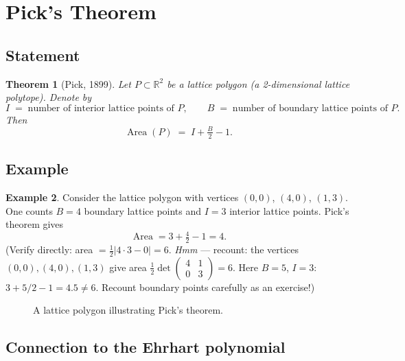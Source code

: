 \documentclass[11pt]{article}
\theoremstyle{plain}
\newtheorem{theorem}{Theorem}[section]
\theoremstyle{definition}
\newtheorem{example}[theorem]{Example}
\newcommand{\R}{\mathbb{R}}
\begin{document}
\section{Pick's Theorem}

\subsection{Statement}

\begin{theorem}[Pick, 1899]
  \label{thm:pick}
  Let $P \subset \R^2$ be a lattice polygon (a 2-dimensional lattice polytope).
  Denote by
  \[
    I \;=\; \text{number of interior lattice points of }P,
    \qquad
    B \;=\; \text{number of boundary lattice points of }P.
  \]
  Then
  \[
    \boxed{\operatorname{Area}(P) \;=\; I + \tfrac{B}{2} - 1.}
  \]
\end{theorem}

\subsection{Example}

\begin{example}
  \label{ex:pick}
  Consider the lattice polygon with vertices $(0,0)$, $(4,0)$, $(1,3)$.
  One counts $B = 4$ boundary lattice points and $I = 3$ interior lattice
  points.  Pick's theorem gives
  \[
    \operatorname{Area} = 3 + \tfrac{4}{2} - 1 = 4.
  \]
  (Verify directly: area $= \tfrac{1}{2}|4 \cdot 3 - 0| = 6$. \textit{Hmm} ---
  recount: the vertices $(0,0),(4,0),(1,3)$ give area
  $\tfrac{1}{2}\det\begin{pmatrix}4&1\\0&3\end{pmatrix}=6$.
  Here $B=5$, $I=3$: $3+5/2-1=4.5 \neq 6$. Recount boundary points carefully
  as an exercise!)
\end{example}

\begin{figure}[H]
  \centering
  
  \caption{A lattice polygon illustrating Pick's theorem.}
  \label{fig:pick}
\end{figure}

\subsection{Connection to the Ehrhart polynomial}
\end{document}
